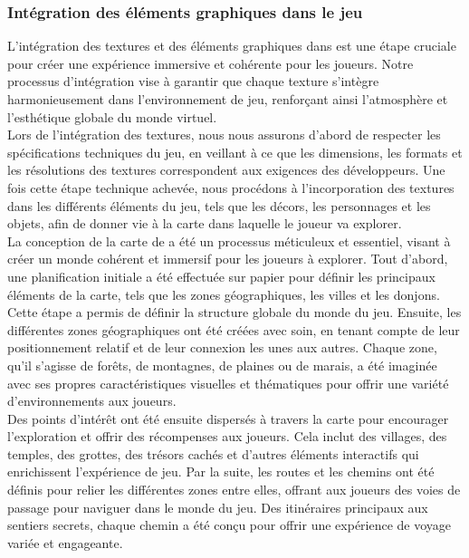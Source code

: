 \subsubsection*{\hspace*{0.6cm}Intégration des éléments graphiques dans le jeu}

L'intégration des textures et des éléments graphiques dans \gameName est une étape cruciale pour créer une expérience immersive et cohérente pour les joueurs.
Notre processus d'intégration vise à garantir que chaque texture s'intègre harmonieusement dans l'environnement de jeu, renforçant ainsi l'atmosphère et l'esthétique globale du monde virtuel.
\\

Lors de l'intégration des textures, nous nous assurons d'abord de respecter les spécifications techniques du jeu, en veillant à ce que les dimensions, les formats et les résolutions des textures correspondent aux exigences des développeurs.
Une fois cette étape technique achevée, nous procédons à l'incorporation des textures dans les différents éléments du jeu, tels que les décors, les personnages et les objets, afin de donner vie à la carte dans laquelle le joueur va explorer.
\\

La conception de la carte de \gameName a été un processus méticuleux et essentiel, visant à créer un monde cohérent et immersif pour les joueurs à explorer.
Tout d'abord, une planification initiale a été effectuée sur papier pour définir les principaux éléments de la carte, tels que les zones géographiques, les villes et les donjons.
\\

Cette étape a permis de définir la structure globale du monde du jeu.
Ensuite, les différentes zones géographiques ont été créées avec soin, en tenant compte de leur positionnement relatif et de leur connexion les unes aux autres.
Chaque zone, qu'il s'agisse de forêts, de montagnes, de plaines ou de marais, a été imaginée avec ses propres caractéristiques visuelles et thématiques pour offrir une variété d'environnements aux joueurs.
\\

Des points d'intérêt ont été ensuite dispersés à travers la carte pour encourager l'exploration et offrir des récompenses aux joueurs.
Cela inclut des villages, des temples, des grottes, des trésors cachés et d'autres éléments interactifs qui enrichissent l'expérience de jeu.
Par la suite, les routes et les chemins ont été définis pour relier les différentes zones entre elles, offrant aux joueurs des voies de passage pour naviguer dans le monde du jeu.
Des itinéraires principaux aux sentiers secrets, chaque chemin a été conçu pour offrir une expérience de voyage variée et engageante.
\\

